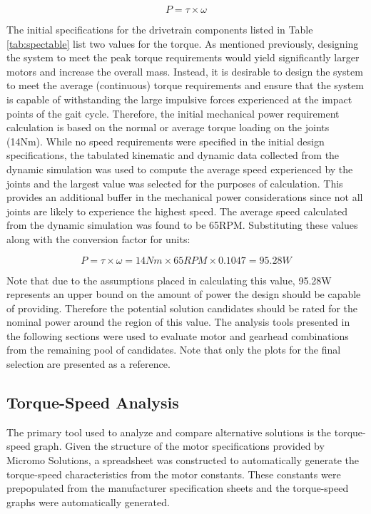 \begin{equation}
	P = \tau \times \omega
\end{equation}

The initial specifications for the drivetrain components listed in Table \ref{tab:spectable} list two values for the torque. As mentioned previously, designing the system to meet the peak torque requirements would yield significantly larger motors and increase the overall mass. Instead, it is desirable to design the system to meet the average (continuous) torque requirements and ensure that the system is capable of withstanding the large impulsive forces experienced at the impact points of the gait cycle. Therefore, the initial mechanical power requirement calculation is based on the normal or average torque loading on the joints (14Nm). While no speed requirements were specified in the initial design specifications, the tabulated kinematic and dynamic data collected from the dynamic simulation was used to compute the average speed experienced by the joints and the largest value was selected for the purposes of calculation. This provides an additional buffer in the mechanical power considerations since not all joints are likely to experience the highest speed. The average speed calculated from the dynamic simulation was found to be 65RPM. Substituting these values along with the conversion factor for units: 

\begin{equation}
	P = \tau \times \omega = 14Nm \times 65RPM \times 0.1047 = 95.28W
\end{equation}

Note that due to the assumptions placed in calculating this value, 95.28W represents an upper bound on the amount of power the design should be capable of providing. Therefore the potential solution candidates should be rated for the nominal power around the region of this value. The analysis tools presented in the following sections were used to evaluate motor and gearhead combinations from the remaining pool of candidates. Note that only the plots for the final selection are presented as a reference.

\subsection{Torque-Speed Analysis} %
\label{sub:torque_speed_analysis}
The primary tool used to analyze and compare alternative solutions is the torque-speed graph. Given the structure of the motor specifications provided by Micromo Solutions, a spreadsheet was constructed to automatically generate the torque-speed characteristics from the motor constants. These constants were prepopulated from the manufacturer specification sheets and the torque-speed graphs were automatically generated. 

